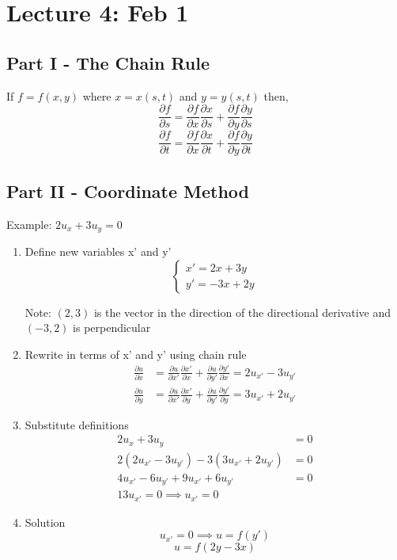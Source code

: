 \documentclass[12pt]{article}
\begin{document}
\section{Lecture 4: Feb 1}
\subsection*{Part I - The Chain Rule}
If $f=f(x, y)$ where $x = x(s, t)$ and $y= y(s, t)$ then, 
\[\frac{\partial f}{\partial s} = \frac{\partial f}{\partial x} \frac{\partial x}{\partial s} + \frac{\partial f}{\partial y} \frac{\partial y}{\partial s}\]
\[\frac{\partial f}{\partial t} = \frac{\partial f}{\partial x} \frac{\partial x}{\partial t} + \frac{\partial f}{\partial y} \frac{\partial y}{\partial t}\]

\subsection*{Part II - Coordinate Method}
Example: $2u_x + 3u_y = 0$

\begin{enumerate}
    \item Define new variables x' and y'
    \[\begin{cases}
        x' = 2x + 3y\\
        y' = -3x + 2y
    \end{cases}\]

    Note: $(2, 3)$ is the vector in the direction of the directional derivative and $(-3, 2)$ is perpendicular

    \item Rewrite in terms of x' and y' using chain rule 
    \begin{align*}
        \frac{\partial u}{\partial x} &= \frac{\partial u}{\partial x'} \frac{\partial x'}{\partial x} + \frac{\partial u}{\partial y'} \frac{\partial y'}{\partial x} = 2u_{x'} - 3u_{y'}\\
        \frac{\partial u}{\partial y} &= \frac{\partial u}{\partial x'} \frac{\partial x'}{\partial y} + \frac{\partial u}{\partial y'} \frac{\partial y'}{\partial y} = 3u_{x'}  + 2u_{y'}
    \end{align*}
    
    \item Substitute definitions
    \begin{align*}
        2u_x + 3u_y &= 0\\
        2(2u_{x'} - 3u_{y'}) - 3(3u_{x'} + 2u_{y'}) &= 0\\
        4u_{x'} - 6u_{y'} + 9u_{x'} + 6u_{y'} &= 0\\
        13u_{x'} = 0 \implies u_{x'} = 0
    \end{align*}

    \item Solution 
    \[u_{x'} = 0 \implies u = f(y')\]
    \[\boxed{u = f(2y-3x)}\]
\end{enumerate}
\end{document}
